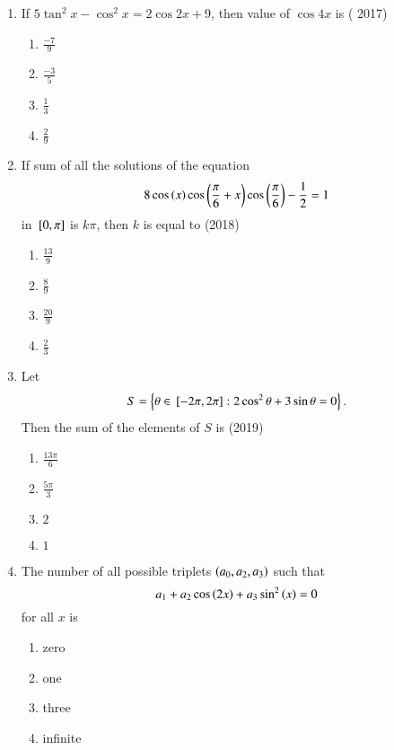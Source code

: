 \begin{enumerate}[label=\thesubsection.\arabic*,ref=\thesubsection.\theenumi]
\item If $5\tan^2x-\cos^2x=2\cos2x+9$, then value of $\cos 4x$ is
%
\hfill{( 2017)}
    \begin{multicols}{4}
\begin{enumerate}
    \item $\frac{-7}{9}$ 
    \item $\frac{-3}{5}$
    \item $\frac{1}{3}$
    \item $\frac{2}{9}$
    \end{enumerate}
\end{multicols}
 \item If sum of all the solutions of the equation
\begin{align*}
  8 \cos\left(x\right)  \cos\left(\frac{\pi}{6} + x \right)  \cos \left(\frac{\pi}{6}\right) - \frac{1}{2} = 1 
\end{align*}
 in  ${}\left[0, \pi\right]$ is  $k \pi$,
 then $k$ is equal to
\hfill{(2018)}
\begin{multicols}{4}
\begin{enumerate}
\item $\frac{13}{9}$
\item $\frac{8}{9}$
\item  $\frac{20}{9}$
\item  $\frac{2}{3}$
\end{enumerate}
\end{multicols}
\item Let $$S=\left\{\theta \in {}\left[-2\pi, 2\pi\right] :2\cos^2\theta + 3\sin\theta=0\right\}.$$
 Then the sum of the elements of $S$ is
\hfill {(2019)}
\begin{multicols}{4}
\begin{enumerate}
\item $\frac{13\pi}{6}$ 
\item $\frac{5\pi}{3}$
 \item $2$
 \item $1$
\end{enumerate}
\end{multicols} 
\item The number of all possible triplets $\left(a_0, a_2, a_3\right)$ such that $$a_1 + a_2 \cos\left(2x\right) + a_3\sin^2\left(x\right) = 0$$ for all $x$ is
\hfill{}
\begin{multicols}{5}
\begin{enumerate}
\item zero
\item one
\item three
\item infinite

\end{enumerate}
\end{multicols}
\end{enumerate}
